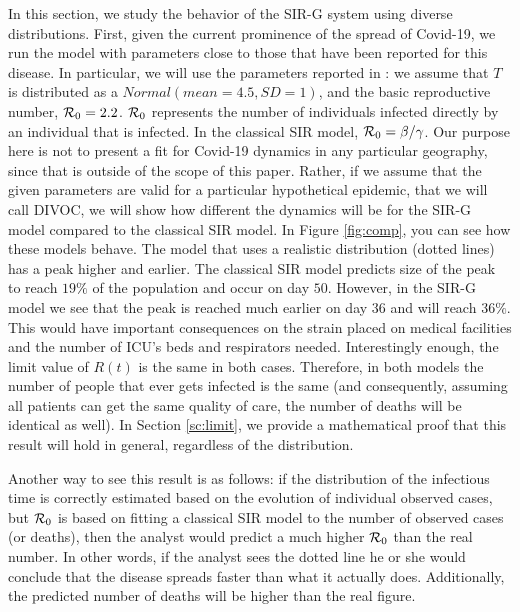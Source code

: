 \documentclass[USenglish,10pt]{article}
\newcommand{\Ro}{\ensuremath\mathcal{R}_0\xspace}
\begin{document}
In this section, we study the behavior of the SIR-G system using diverse distributions.
First, given the current prominence of the spread of Covid-19, we run the model with parameters close to those that have been reported for this disease. In particular, we will use the parameters reported in \cite{lour.ea20}: we assume that $T$ is distributed as a $Normal(mean=4.5, SD=1)$, and the basic reproductive number, $\Ro=2.2$.
$\Ro$ represents the number of individuals infected directly by an individual that is infected. In the classical SIR model, $\Ro=\beta/\gamma$.
Our purpose here is not to present a fit for Covid-19 dynamics in any particular geography, since that is outside of the scope of this paper.
Rather, if we assume that the given parameters are valid for a particular hypothetical epidemic, that we will call DIVOC, we will show how different the dynamics will be for the SIR-G model compared to the classical SIR model.
In Figure \ref{fig:comp}, you can see how these models behave. The model that uses a realistic distribution (dotted lines) has a peak higher and earlier. The classical SIR model predicts size of the peak to reach $19\%$ of the population and occur on day $50$.
However, in the SIR-G model we see that the peak is reached much earlier on day $36$ and will reach $36\%$. This would have important consequences on the strain placed on medical facilities and the number of ICU's beds and respirators needed.
Interestingly enough, the limit value of $R(t)$ is the same in both cases. Therefore, in both models the number of people that ever gets infected is the same (and consequently, assuming all patients can get the same quality of care, the number of deaths will be identical as well). In Section \ref{sc:limit}, we provide a mathematical proof that this result will hold in general, regardless of the distribution.

Another way to see this result is as follows: if the distribution of the infectious time is correctly estimated based on the evolution of individual observed cases, but $\Ro$ is based on fitting a classical SIR model to the number of observed cases (or deaths), then the analyst would predict a much higher $\Ro$ than the real number. In other words, if the analyst sees the dotted line he or she would conclude that the disease spreads faster than what it actually does. Additionally, the predicted number of deaths will be higher than the real figure.
\end{document}
